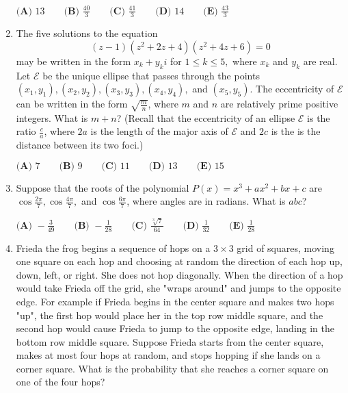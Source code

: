 \documentclass{article}
\begin{document}
\begin{enumerate}[label=\arabic*., itemsep=0.5em]
\(\textbf{(A) }13 \qquad \textbf{(B) }\frac{40}3 \qquad \textbf{(C) }\frac{41}3 \qquad \textbf{(D) }14\qquad \textbf{(E) }\frac{43}3\)\par \vspace{0.5em}\item The five solutions to the equation
\begin{equation*}
(z-1)(z^2+2z+4)(z^2+4z+6)=0
\end{equation*}
 may be written in the form \(x_k+y_ki\) for \(1\le k\le 5,\) where \(x_k\) and \(y_k\) are real. Let \(\mathcal E\) be the unique ellipse that passes through the points \((x_1,y_1),(x_2,y_2),(x_3,y_3),(x_4,y_4),\) and \((x_5,y_5)\). The eccentricity of \(\mathcal E\) can be written in the form \(\sqrt{\frac mn}\), where \(m\) and \(n\) are relatively prime positive integers. What is \(m+n\)? (Recall that the eccentricity of an ellipse \(\mathcal E\) is the ratio \(\frac ca\), where \(2a\) is the length of the major axis of \(\mathcal E\) and \(2c\) is the is the distance between its two foci.)

\(\textbf{(A) }7 \qquad \textbf{(B) }9 \qquad \textbf{(C) }11 \qquad \textbf{(D) }13\qquad \textbf{(E) }15\)\par \vspace{0.5em}\item Suppose that the roots of the polynomial \(P(x)=x^3+ax^2+bx+c\) are \(\cos \frac{2\pi}7,\cos \frac{4\pi}7,\) and \(\cos \frac{6\pi}7\), where angles are in radians. What is \(abc\)?

\(\textbf{(A) }{-}\frac{3}{49} \qquad \textbf{(B) }{-}\frac{1}{28} \qquad \textbf{(C) }\frac{\sqrt[3]7}{64} \qquad \textbf{(D) }\frac{1}{32}\qquad \textbf{(E) }\frac{1}{28}\)\par \vspace{0.5em}\item Frieda the frog begins a sequence of hops on a \(3\times3\) grid of squares, moving one square on each hop and choosing at random the direction of each hop up, down, left, or right. She does not hop diagonally. When the direction of a hop would take Frieda off the grid, she "wraps around" and jumps to the opposite edge. For example if Frieda begins in the center square and makes two hops "up", the first hop would place her in the top row middle square, and the second hop would cause Frieda to jump to the opposite edge, landing in the bottom row middle square. Suppose Frieda starts from the center square, makes at most four hops at random, and stops hopping if she lands on a corner square. What is the probability that she reaches a corner square on one of the four hops?


\end{enumerate}
\end{document}
